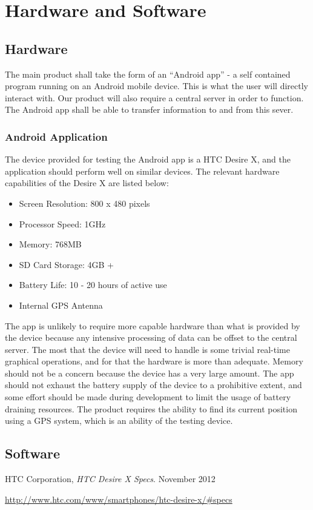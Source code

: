 \documentclass[a4paper]{article}
\begin{document}
	\section{Hardware and Software}
		\subsection{Hardware}
			The main product shall take the form of an ``Android app'' - a self contained program running on an Android mobile device. This is what the user will directly interact with. Our product will also require a central server in order to function. The Android app shall be able to transfer information to and from this sever.

			\subsubsection{Android Application}
				The device provided for testing the Android app is a HTC Desire X, and the application should perform well on similar devices. The relevant hardware capabilities of the Desire X are listed below\cite{htcdesirex}:

				\begin{itemize}
					\item Screen Resolution: 800 x 480 pixels
					\item Processor Speed: 1GHz
					\item Memory: 768MB
					\item SD Card Storage: 4GB +
					\item Battery Life: 10 - 20 hours of active use
					\item Internal GPS Antenna
				\end{itemize}

				\noindent
				The app is unlikely to require more capable hardware than what is provided by the device because any intensive processing of data can be offset to the central server. The most that the device will need to handle is some trivial real-time graphical operations, and for that the hardware is more than adequate. Memory should not be a concern because the device has a very large amount. The app should not exhaust the battery supply of the device to a prohibitive extent, and some effort should be made during development to limit the usage of battery draining resources. The product requires the ability to find its current position using a GPS system, which is an ability of the testing device.
		\subsection{Software}

	\begin{thebibliography}{9}
			HTC Corporation,
			\emph{HTC Desire X Specs}.
			November 2012

			\url{http://www.htc.com/www/smartphones/htc-desire-x/#specs}
	\end{thebibliography}
\end{document}
